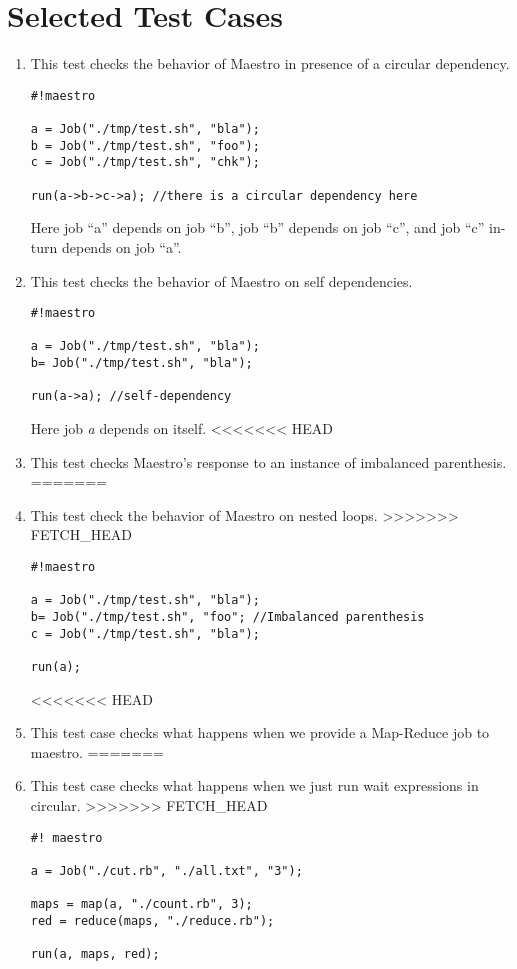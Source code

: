 \section{Selected Test Cases}
\begin{enumerate}

\item This test checks the behavior of Maestro in presence of a circular
dependency.
\begin{verbatim}
#!maestro

a = Job("./tmp/test.sh", "bla");
b = Job("./tmp/test.sh", "foo");
c = Job("./tmp/test.sh", "chk");

run(a->b->c->a); //there is a circular dependency here
\end{verbatim}
Here job ``a'' depends on job ``b'', job ``b'' depends on job ``c'', and job
``c'' in-turn depends on job ``a''.

\item This test checks the behavior of Maestro on self dependencies.
\begin{verbatim}
#!maestro

a = Job("./tmp/test.sh", "bla");
b= Job("./tmp/test.sh", "bla");

run(a->a); //self-dependency
\end{verbatim}
Here job \textit{a} depends on itself.
\newpage
<<<<<<< HEAD
\noindent \item This test checks Maestro's response to an instance of imbalanced parenthesis.
=======
\noindent \item This test check the behavior of Maestro on nested loops.
>>>>>>> FETCH_HEAD
\begin{verbatim}
#!maestro

a = Job("./tmp/test.sh", "bla");
b= Job("./tmp/test.sh", "foo"; //Imbalanced parenthesis
c = Job("./tmp/test.sh", "bla");

run(a);
\end{verbatim}

<<<<<<< HEAD
\item This test case checks what happens when we provide a Map-Reduce job to maestro.
=======
\item This test case checks what happens when we just run wait expressions in
circular.
>>>>>>> FETCH_HEAD
\begin{verbatim}
#! maestro

a = Job("./cut.rb", "./all.txt", "3");

maps = map(a, "./count.rb", 3);
red = reduce(maps, "./reduce.rb");

run(a, maps, red);
\end{verbatim}

\end{enumerate}
